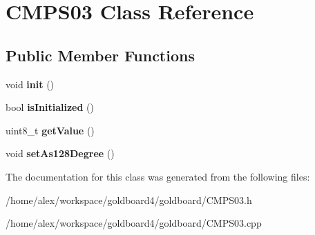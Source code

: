 \hypertarget{class_c_m_p_s03}{}\section{C\+M\+P\+S03 Class Reference}
\label{class_c_m_p_s03}
\subsection*{Public Member Functions}
\begin{DoxyCompactItemize}
\item 
void {\bfseries init} ()\hypertarget{class_c_m_p_s03_ac06595a1078df9e38bb5fbccaf459515}{}\label{class_c_m_p_s03_ac06595a1078df9e38bb5fbccaf459515}

\item 
bool {\bfseries is\+Initialized} ()\hypertarget{class_c_m_p_s03_a468491e6cff0e8456224d423a8e35204}{}\label{class_c_m_p_s03_a468491e6cff0e8456224d423a8e35204}

\item 
uint8\+\_\+t {\bfseries get\+Value} ()\hypertarget{class_c_m_p_s03_ab655cbe4fa5be60e9d9dbba7cd815865}{}\label{class_c_m_p_s03_ab655cbe4fa5be60e9d9dbba7cd815865}

\item 
void {\bfseries set\+As128\+Degree} ()\hypertarget{class_c_m_p_s03_a9c3183e6c8af4226b8291003a225b595}{}\label{class_c_m_p_s03_a9c3183e6c8af4226b8291003a225b595}

\end{DoxyCompactItemize}


The documentation for this class was generated from the following files\+:\begin{DoxyCompactItemize}
\item 
/home/alex/workspace/goldboard4/goldboard/C\+M\+P\+S03.\+h\item 
/home/alex/workspace/goldboard4/goldboard/C\+M\+P\+S03.\+cpp\end{DoxyCompactItemize}

